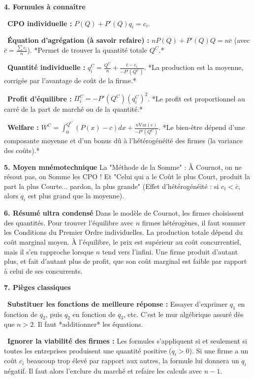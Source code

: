 \documentclass[11pt, a4paper]{report}
\begin{document}
\textbf{4. Formules à connaître}
\par \textbullet\ \textbf{CPO individuelle :} $P(Q) + P'(Q)q_i = c_i$.
\par \textbullet\ \textbf{Équation d'agrégation (à savoir refaire) :} $nP(Q) + P'(Q)Q = n\bar{c}$ (avec $\bar{c} = \frac{\sum c_i}{n}$). *Permet de trouver la quantité totale $Q^C$.*
\par \textbullet\ \textbf{Quantité individuelle :} $q_i^C = \frac{Q^C}{n} + \frac{\bar{c} - c_i}{-P'(Q^C)}$. *La production est la moyenne, corrigée par l'avantage de coût de la firme.*
\par \textbullet\ \textbf{Profit d'équilibre :} $\Pi_i^C = -P'(Q^C)(q_i^C)^2$. *Le profit est proportionnel au carré de la part de marché ou de la quantité.*
\par \textbullet\ \textbf{Welfare :} $W^C = \int_0^{Q^C} (P(x) - c)dx + \frac{n\text{Var}(c)}{-P'(Q^C)}$. *Le bien-être dépend d'une composante moyenne et d'un bonus dû à l'hétérogénéité des firmes (la variance des coûts).*

\textbf{5. Moyen mnémotechnique}
La "Méthode de la Somme" : À Cournot, on ne résout pas, on Somme les CPO ! Et "Celui qui a le Coût le plus Court, produit la part la plus Courte... pardon, la plus grande" (Effet d'hétérogénéité : si $c_i < \bar{c}$, alors $q_i$ est plus grand que la moyenne).

\textbf{6. Résumé ultra condensé}
Dans le modèle de Cournot, les firmes choisissent des quantités. Pour trouver l'équilibre avec $n$ firmes hétérogènes, il faut sommer les Conditions du Premier Ordre individuelles. La production totale dépend du coût marginal moyen. À l'équilibre, le prix est supérieur au coût concurrentiel, mais il s'en rapproche lorsque $n$ tend vers l'infini. Une firme produit d'autant plus, et fait d'autant plus de profit, que son coût marginal est faible par rapport à celui de ses concurrents.

\textbf{7. Pièges classiques}
\par \textbullet\ \textbf{Substituer les fonctions de meilleure réponse :} Essayer d'exprimer $q_1$ en fonction de $q_2$, puis $q_2$ en fonction de $q_3$, etc. C'est le mur algébrique assuré dès que $n>2$. Il faut *additionner* les équations.
\par \textbullet\ \textbf{Ignorer la viabilité des firmes :} Les formules s'appliquent si et seulement si toutes les entreprises produisent une quantité positive ($q_i > 0$). Si une firme a un coût $c_i$ beaucoup trop élevé par rapport aux autres, la formule lui donnera un $q_i$ négatif. Il faut alors l'exclure du marché et refaire les calculs avec $n-1$.
\end{document}
